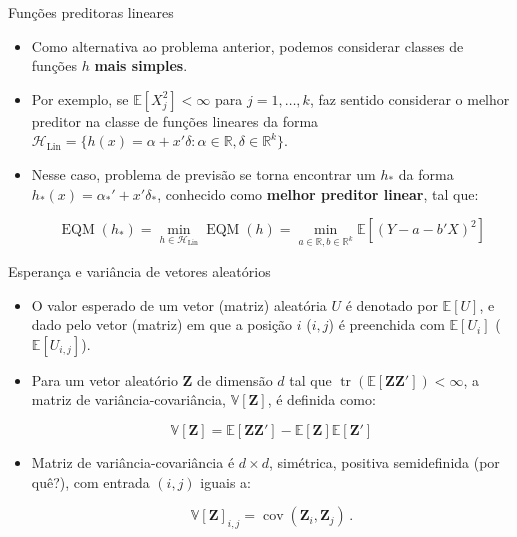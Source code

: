 \documentclass[11pt]{beamer}
\begin{document}
\begin{frame}{Funções preditoras lineares}
	\begin{itemize}
		\item Como alternativa ao problema anterior, podemos considerar classes de funções $h$ \textbf{mais simples}.
		\item Por exemplo, se $\mathbb{E}[X_j^2] < \infty$ para $j=1,\ldots, k$, faz sentido considerar o melhor preditor na classe de funções lineares da forma $\mathcal{H}_{\text{Lin}} = \{h(x) = \alpha + x'\delta: \alpha \in \mathbb{R}, \delta \in \mathbb{R}^k \}$.
		\item Nesse caso, problema de previsão se torna encontrar um $h_*$ da forma $h_*(x) = \alpha_*' + x'\delta_*$, conhecido como \textbf{melhor preditor linear}, tal que:
		
		$$\operatorname{EQM}(h_*) = \min_{h \in \mathcal{H}_{\text{Lin}}} \operatorname{EQM}(h)= \min_{a \in \mathbb{R}, b \in \mathbb{R}^k}\mathbb{E}[(Y-a-b'X)^2] $$
	\end{itemize}
\end{frame}
\begin{frame}{Esperança e variância de vetores aleatórios}
\begin{itemize}
	\item O valor esperado de um vetor (matriz) aleatória $U$ é denotado por $\mathbb{E}[U]$, e dado pelo vetor (matriz) em que a posição $i$ ($i,j$) é preenchida com $\mathbb{E}[U_i]$ ($\mathbb{E}[U_{i,j}]$).
	\item Para um vetor aleatório $\boldsymbol{Z}$ de dimensão $d$ tal que $\operatorname{tr}(\mathbb{E}[\boldsymbol{Z}\boldsymbol{Z}'])<\infty$, a matriz de variância-covariância, $\mathbb{V}[\boldsymbol{Z}] $, é definida como:
	
	$$\mathbb{V}[\boldsymbol{Z}]  = \mathbb{E}[\boldsymbol{Z}\boldsymbol{Z}'] - \mathbb{E}[\boldsymbol{Z}]\mathbb{E}[\boldsymbol{Z}']$$
	
	\item Matriz de variância-covariância é $d \times d$, simétrica, positiva semidefinida (por quê?), com entrada $(i,j)$ iguais a:
	
	$$\mathbb{V}[\boldsymbol{Z}]_{i,j}= \operatorname{cov}(\boldsymbol{Z}_i,\boldsymbol{Z}_j)\, .$$
	
\end{itemize}
\end{frame}
\end{document}
